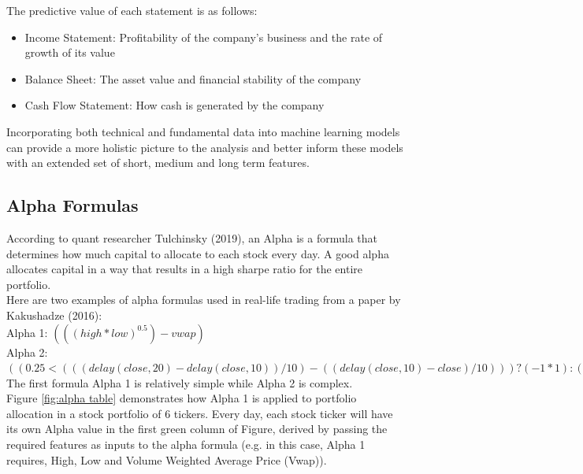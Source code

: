 \documentclass[a4paper,12pt]{report}
\numberwithin{equation}{section}
\theoremstyle{definition}
\begin{document}
The predictive value of each statement is as follows:
\begin{itemize}
  \item {Income Statement: Profitability of the company's business and the rate of growth of its value}
  \item {Balance Sheet: The asset value and financial stability of the company }
  \item {Cash Flow Statement: How cash is generated by the company}
\end{itemize}

Incorporating both technical and fundamental data into machine learning models can provide a more holistic picture to the analysis and better inform these models with an extended set of short, medium and long term features.

\subsection{Alpha Formulas}
According to quant researcher Tulchinsky (2019), an Alpha is a formula that determines how much capital to allocate to each stock every day. A good alpha allocates capital in a way that results in a high sharpe ratio for the entire portfolio.\\

Here are two examples of alpha formulas used in real-life trading from a paper by Kakushadze (2016): \\

Alpha 1: $(((high * low)^{0.5}) - vwap)$\\

Alpha 2: $((0.25 < (((delay(close, 20) - delay(close, 10)) / 10) - ((delay(close, 10) - close) / 10))) ?
(-1 * 1) : (((((delay(close, 20) - delay(close, 10)) / 10) - ((delay(close, 10) - close) / 10)) < 0) ? 1 :
((-1 * 1) * (close - delay(close, 1)))))$ \\

The first formula Alpha 1 is relatively simple while Alpha 2 is complex. \\

Figure \ref{fig:alpha table} demonstrates how Alpha 1 is applied to portfolio allocation in a stock portfolio of 6 tickers. Every day, each stock ticker will have its own Alpha value in the first green column of Figure, derived by passing the required features as inputs to the alpha formula (e.g. in this case, Alpha 1 requires, High, Low and Volume Weighted Average Price (Vwap)). \\
\end{document}
